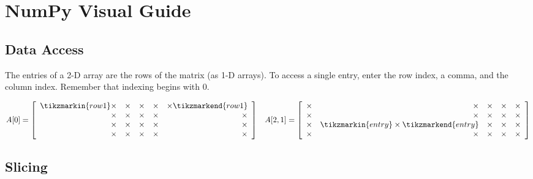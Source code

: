 \newpage

\section*{NumPy Visual Guide} %

\subsection*{Data Access} %

The entries of a 2-D array are the rows of the matrix (as 1-D arrays).
To access a single entry, enter the row index, a comma, and the column index.
Remember that indexing begins with $0$.

\begin{align*}
A[0] = \left[\begin{array}{rrrrr}
\tikzmarkin{row1}\times & \times & \times & \times & \times\tikzmarkend{row1}\\
\times & \times & \times & \times & \times\\
\times & \times & \times & \times & \times\\
\times & \times & \times & \times & \times\\
\end{array}\right]
&&
A[2,1] = \left[\begin{array}{rrrrr}
\times & \times & \times & \times & \times\\
\times & \times & \times & \times & \times\\
\times & \tikzmarkin{entry} \times \tikzmarkend{entry} & \times & \times & \times\\
\times & \times & \times & \times & \times
\end{array}\right]
\end{align*}

\subsection*{Slicing} %

